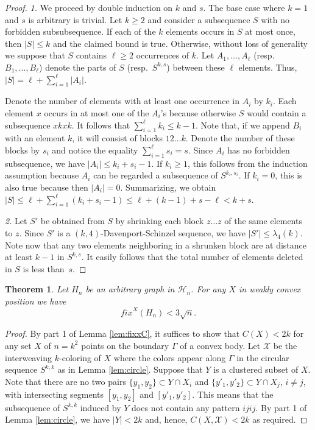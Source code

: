 \documentclass[reqno,12pt]{amsart}
\newtheorem{theorem}{Theorem}[section]
\newcounter{claim}
\newcommand{\fixx}[1]{\mathit{fix}^X(#1)}
\newcommand{\colX}{{\mathcal X}}
\newcommand{\calH}{{\mathcal H}}
\begin{document}
\begin{proof}
{\sl 1.}
We proceed by double induction on $k$ and $s$.
The base case where $k=1$ and $s$ is arbitrary is trivial.
Let $k\ge2$ and consider a subsequence $S$ with no forbidden subsubsequence. 
If each of the $k$ elements occurs in $S$ at most once, then
$|S|\le k$ and the claimed bound is true. Otherwise, without loss of generality 
we suppose that $S$ contains $\ell\ge2$ occurrences of $k$. 
Let $A_1,\ldots,A_\ell$ (resp.\ $B_1,\ldots,B_\ell$) 
denote the parts of $S$ (resp.\ $S^{k,s}$) between these $\ell$ elements.
Thus, $|S|=\ell+\sum_{i=1}^\ell|A_i|$. 

Denote the number of elements with at least one occurrence in $A_i$ by $k_i$.
Each element $x$ occurs in at most one of the $A_i$'s because otherwise
$S$ would contain a subsequence $xkxk$. It follows that $\sum_{i=1}^\ell k_i\le k-1$.
Note that, if we append $B_i$ with an element $k$,
it will consist of blocks $12\ldots k$. Denote the number of these blocks
by $s_i$ and notice the equality $\sum_{i=1}^\ell s_i=s$.
Since $A_i$ has no forbidden subsequence, we have $|A_i|\le k_i+s_i-1$.
If $k_i\ge1$, this follows from the induction assumption because
$A_i$ can be regarded a subsequence of $S^{k_i,s_i}$.
If $k_i=0$, this is also true because then $|A_i|=0$.
Summarizing, we obtain $|S|\le\ell+\sum_{i=1}^\ell(k_i+s_i-1)\le\ell+(k-1)+s-\ell<k+s$.

{\sl 2.}
Let $S'$ be obtained from $S$ by shrinking each block $z\ldots z$
of the same elements to $z$. Since $S'$ is a $(k,4)$-Davenport-Schinzel 
sequence, we have $|S'|\le\lambda_4(k)$. Note now that any two elements
neighboring in a shrunken block are at distance at least $k-1$ in $S^{k,s}$.
It easily follows that the total number of elements deleted in $S$ is less
than~$s$.
\end{proof}

\begin{theorem}\label{thm:fix}
Let $H_n$ be an arbitrary graph in $\calH_n$. For any $X$ in weakly convex position we have
$$\fixx{H_n}<3\sqrt n.$$ 
\end{theorem}

\begin{proof}
By part 1 of Lemma \ref{lem:fixxC}, it suffices to show that $C(X)<2k$
for any set $X$ of $n=k^2$ points on the boundary $\Gamma$ of a convex body.
Let $\colX$ be the interweaving $k$-coloring of $X$ where the colors appear
along $\Gamma$ in the circular sequence $S^{k,k}$ as in Lemma \ref{lem:circle}.
Suppose that $Y$ is a clustered subset of $X$. Note that there are no
two pairs $\{y_1,y_2\}\subset Y\cap X_i$ and $\{y'_1,y'_2\}\subset Y\cap X_j$, $i\ne j$,
with intersecting segments $[y_1,y_2]$ and $[y'_1,y'_2]$. This means that
the subsequence of $S^{k,k}$ induced by $Y$ does not contain any pattern
$ijij$. By part 1 of Lemma \ref{lem:circle}, we have $|Y|<2k$ and, hence,
$C(X,\colX)<2k$ as required.
\end{proof}
\end{document}
